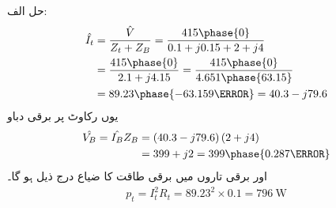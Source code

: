 حل الف:
\begin{align*}
\hat{I_t}&=\frac{\hat{V}}{Z_t+Z_B}=\frac{415\phase{0}}{0.1+j 0.15+2+j 4}\\
&=\frac{415\phase{0}}{2.1+j 4.15}=\frac{415\phase{0}}{4.651\phase{63.15}}\\
&=89.23\phase{-63.159\degree}=40.3-j79.6
\end{align*}
یوں رکاوٹ پر برقی دباو
\begin{align*}
\hat{V_B}=\hat{I_B} Z_B&=\left(40.3-j79.6 \right) \left( 2+j 4\right)\\
&=399+j2=399\phase{0.287\degree}
\end{align*}
اور برقی تاروں میں برقی طاقت کا ضیاع درج ذیل ہو گا۔
\begin{align*}
p_t=I_t^2 R_t=89.23^2 \times 0.1=\SI{796}{\watt}
\end{align*}

